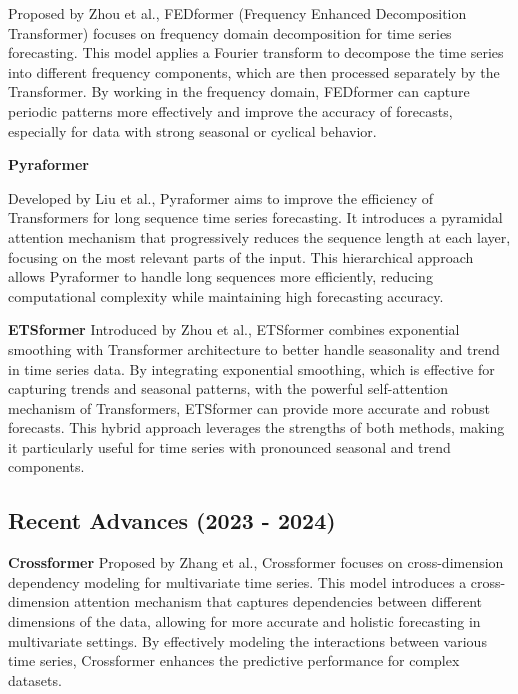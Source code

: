 \noindent Proposed by Zhou et al.\cite{zhou2022fedformerfrequencyenhanceddecomposed}, FEDformer (Frequency Enhanced Decomposition Transformer) focuses on frequency domain decomposition for time series forecasting. This model applies a Fourier transform to decompose the time series into different frequency components, which are then processed separately by the Transformer. By working in the frequency domain, FEDformer can capture periodic patterns more effectively and improve the accuracy of forecasts, especially for data with strong seasonal or cyclical behavior.
\vspace{10pt}


\noindent\textbf
{Pyraformer}

\noindent Developed by Liu et al.\cite{liu2022pyraformer}, Pyraformer aims to improve the efficiency of Transformers for long sequence time series forecasting. It introduces a pyramidal attention mechanism that progressively reduces the sequence length at each layer, focusing on the most relevant parts of the input. This hierarchical approach allows Pyraformer to handle long sequences more efficiently, reducing computational complexity while maintaining high forecasting accuracy.
\vspace{10pt}


\noindent\textbf
{ETSformer}
 Introduced by Zhou et al.\cite{woo2022etsformerexponentialsmoothingtransformers}, ETSformer combines exponential smoothing with Transformer architecture to better handle seasonality and trend in time series data. By integrating exponential smoothing, which is effective for capturing trends and seasonal patterns, with the powerful self-attention mechanism of Transformers, ETSformer can provide more accurate and robust forecasts. This hybrid approach leverages the strengths of both methods, making it particularly useful for time series with pronounced seasonal and trend components.
\vspace{10pt}


\subsection{Recent Advances (2023 - 2024)}
\noindent\textbf
{Crossformer}
 Proposed by Zhang et al.\cite{wang2021crossformerversatilevisiontransformer}, Crossformer focuses on cross-dimension dependency modeling for multivariate time series. This model introduces a cross-dimension attention mechanism that captures dependencies between different dimensions of the data, allowing for more accurate and holistic forecasting in multivariate settings. By effectively modeling the interactions between various time series, Crossformer enhances the predictive performance for complex datasets.
\vspace{10pt}


